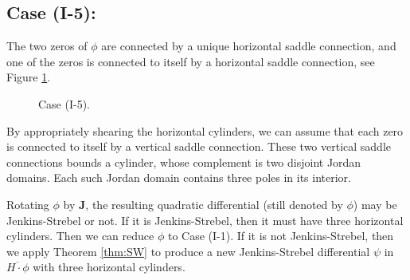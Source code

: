 \documentclass[11pt]{amsart}
\theoremstyle{plain}
\newcommand{\rot}{\mathbf{J}}
\begin{document}




 
\subsection*{Case \textbf{(I-5):}} The two zeros of $\phi$ are connected by a unique horizontal saddle connection, and one of the zeros is connected  to itself by a horizontal saddle connection, see Figure \ref{fig:I-5}.


\begin{figure}[h]
    \centering
    \caption{Case (I-5).}
    \label{fig:I-5}
\end{figure}

 
 By  appropriately shearing the horizontal cylinders, we can assume that each zero
  is connected  to itself by a vertical saddle connection. These two vertical saddle connections bounds a cylinder, whose complement is two disjoint Jordan domains. Each such Jordan domain contains three poles in its interior. 
  
  Rotating  $\phi$ by $\rot$,
   the resulting quadratic differential (still denoted by $\phi$) may be Jenkins-Strebel or not.
     If it is Jenkins-Strebel, then it must have three horizontal cylinders. Then we can reduce $\phi$
     to Case (I-1). 
      If it is not Jenkins-Strebel, then we apply Theorem \ref{thm:SW} to produce a new Jenkins-Strebel differential $\psi$ in $\overline{H\cdot \phi}$ with three horizontal cylinders. 
\end{document}
